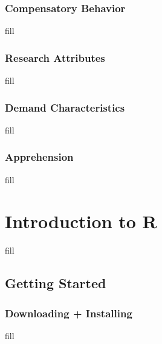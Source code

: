 \documentclass[
  b5paper]{book}
\begin{document}
\hypertarget{compensatory-behavior}{%
\subsection*{Compensatory Behavior}\label{compensatory-behavior}}

fill

\hypertarget{research-attributes}{%
\subsection*{Research Attributes}\label{research-attributes}}

fill

\hypertarget{demand-characteristics}{%
\subsection*{Demand Characteristics}\label{demand-characteristics}}

fill

\hypertarget{apprehension}{%
\subsection*{Apprehension}\label{apprehension}}

fill

\hypertarget{introduction-to-r-1}{%
\chapter{Introduction to R}\label{introduction-to-r-1}}

fill

\hypertarget{getting-started}{%
\section{Getting Started}\label{getting-started}}

\hypertarget{downloading-installing}{%
\subsection*{Downloading + Installing}\label{downloading-installing}}

fill
\end{document}
